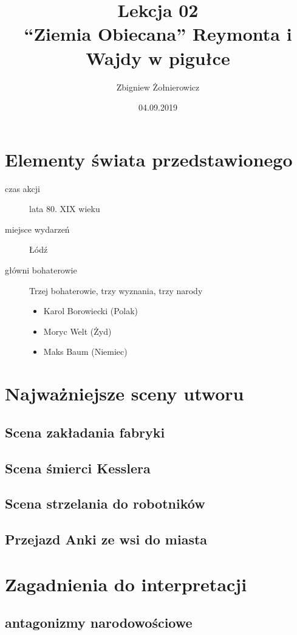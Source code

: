 \documentclass[a4paper]{article}
\begin{document}
\title{{\huge Lekcja 02} \\
{\large ``Ziemia Obiecana'' Reymonta i Wajdy w pigułce}}
\author{Zbigniew Żołnierowicz}
\date{04.09.2019}
\maketitle
\section{Elementy świata przedstawionego}
\begin{description}
    \item[czas akcji] lata 80. XIX wieku
    \item[miejsce wydarzeń] Łódź
    \item[główni bohaterowie] Trzej bohaterowie, trzy wyznania, trzy narody
    \begin{itemize}
        \item Karol Borowiecki (Polak)
        \item Moryc Welt (Żyd)
        \item Maks Baum (Niemiec)
    \end{itemize}
\end{description}
\section{Najważniejsze sceny utworu}
\subsection*{Scena zakładania fabryki}
\subsection*{Scena śmierci Kesslera}
\subsection*{Scena strzelania do robotników}
\subsection*{Przejazd Anki ze wsi do miasta}
\section{Zagadnienia do interpretacji}
\subsection*{antagonizmy narodowościowe}
\end{document}
